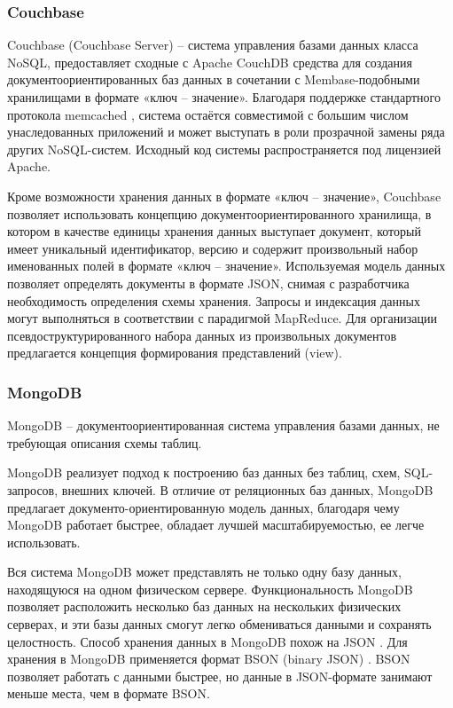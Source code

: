 \subsubsection{Couchbase}

Couchbase (Couchbase Server) \cite{couchbase} -- система управления базами данных класса NoSQL, предоставляет сходные с Apache CouchDB средства для создания документоориентированных баз данных в сочетании с Membase-подобными хранилищами в формате «ключ -- значение». Благодаря поддержке стандартного протокола memcached \cite{memcached}, система остаётся совместимой с большим числом унаследованных приложений и может выступать в роли прозрачной замены ряда других NoSQL-систем. Исходный код системы распространяется под лицензией Apache.

Кроме возможности хранения данных в формате «ключ -- значение», Couchbase позволяет использовать концепцию документоориентированного хранилища, в котором в качестве единицы хранения данных выступает документ, который имеет уникальный идентификатор, версию и содержит произвольный набор именованных полей в формате «ключ -- значение». Используемая модель данных позволяет определять документы в формате JSON, снимая с разработчика необходимость определения схемы хранения. Запросы и индексация данных могут выполняться в соответствии с парадигмой MapReduce. Для организации псевдоструктурированного набора данных из произвольных документов предлагается концепция формирования представлений (view).

\subsubsection{MongoDB}

MongoDB \cite{mongo} -- документоориентированная система управления базами данных, не требующая описания схемы таблиц.

MongoDB реализует подход к построению баз данных без таблиц, схем, SQL-запросов, внешних ключей. В отличие от реляционных баз данных, MongoDB предлагает документо-ориентированную модель данных, благодаря чему MongoDB работает быстрее, обладает лучшей масштабируемостью, ее легче использовать.

Вся система MongoDB может представлять не только одну базу данных, находящуюся на одном физическом сервере. Функциональность MongoDB позволяет расположить несколько баз данных на нескольких физических серверах, и эти базы данных смогут легко обмениваться данными и сохранять целостность.
Способ хранения данных в MongoDB похож на JSON \cite{JSON}. Для хранения в MongoDB применяется формат BSON (binary JSON) \cite{BSON}. BSON позволяет работать с данными быстрее, но данные в JSON-формате занимают меньше места, чем в формате BSON.

